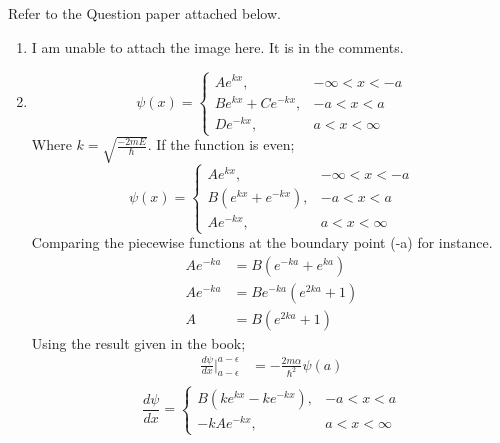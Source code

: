 \documentclass[addpoints]{exam}
\begin{document}
\begin{questions}
    \question Refer to the Question paper attached below.
    \begin{solution}
        \begin{enumerate}
            \item I am unable to attach the image here. It is in the comments.
            \item \[
                      \psi(x) = \begin{cases}
                          Ae^{kx},            & -\infty<x<-a \\
                          Be^{kx} + Ce^{-kx}, & -a<x<a       \\
                          De^{-kx},           & a<x<\infty
                      \end{cases}
                  \]
                  \noindent Where $k = \sqrt{\frac{-2mE}{\hbar}}$.
                  \noindent If the function is even;
                  \[
                      \psi(x) = \begin{cases}
                          Ae^{kx},             & -\infty<x<-a \\
                          B(e^{kx} + e^{-kx}), & -a<x<a       \\
                          Ae^{-kx},            & a<x<\infty
                      \end{cases}
                  \]
                  \noindent Comparing the piecewise functions at the boundary point (-a) for instance.
                  \begin{align*}
                      Ae^{-ka} & = B(e^{-ka} + e^{ka})   \\
                      Ae^{-ka} & = Be^{-ka}(e^{2ka} + 1) \\
                      A        & = B(e^{2ka} + 1)
                  \end{align*}
                  Using the result given in the book;
                  \begin{align*}
                      \frac{d\psi}{dx}\Big|_{a-\epsilon}^{a-\epsilon} & = -\frac{2m\alpha}{\hbar^2}\psi(a) \\
                  \end{align*}
                  \[
                      \frac{d\psi}{dx} = \begin{cases}
                          B(ke^{kx} - ke^{-kx}), & -a<x<a     \\
                          -kAe^{-kx},            & a<x<\infty
                      \end{cases}
\]
\end{enumerate}
\end{solution}
\end{questions}
\end{document}
